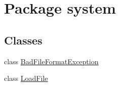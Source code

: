 \hypertarget{namespacesystem}{}\section{Package system}
\label{namespacesystem}
\subsection*{Classes}
\begin{DoxyCompactItemize}
\item 
class \mbox{\hyperlink{classsystem_1_1_bad_file_format_exception}{Bad\+File\+Format\+Exception}}
\item 
class \mbox{\hyperlink{classsystem_1_1_load_file}{Load\+File}}
\end{DoxyCompactItemize}
